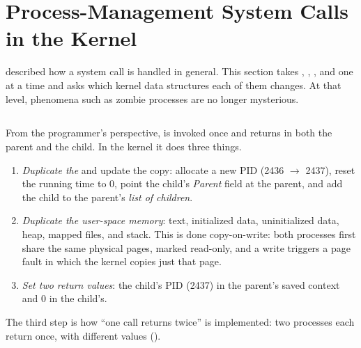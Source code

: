 \section{Process-Management System Calls in the Kernel}
\label{sec:internals}

 described how a system call is handled in general. This section takes , , , and  one at a time and asks which kernel data structures each of them changes. At that level, phenomena such as zombie processes are no longer mysterious.

\subsection{\texorpdfstring{}{fork()}}

From the programmer's perspective,  is invoked once and returns in both the parent and the child. In the kernel it does three things.
\begin{enumerate}
  \item \emph{Duplicate the \ts{}} and update the copy: allocate a new PID (2436 $\to$ 2437), reset the running time to $0$, point the child's \emph{Parent} field at the parent, and add the child to the parent's \emph{list of children}.
  \item \emph{Duplicate the user-space memory}: text, initialized data, uninitialized data, heap, mapped files, and stack. This is done copy-on-write: both processes first share the same physical pages, marked read-only, and a write triggers a page fault in which the kernel copies just that page.
  \item \emph{Set two return values}: the child's PID (2437) in the parent's saved context and $0$ in the child's.
\end{enumerate}
The third step is how ``one call returns twice'' is implemented: two processes each return once, with different values ().

